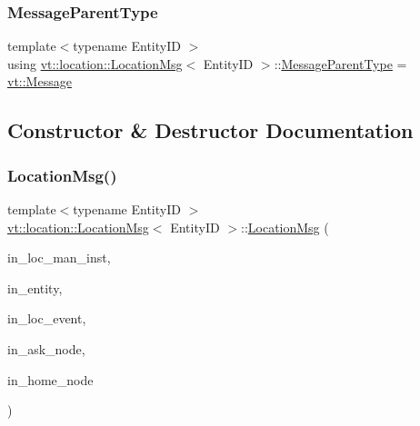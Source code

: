 \subsubsection{\texorpdfstring{Message\+Parent\+Type}{MessageParentType}}
{\footnotesize\ttfamily template$<$typename Entity\+ID $>$ \\
using \hyperlink{structvt_1_1location_1_1_location_msg}{vt\+::location\+::\+Location\+Msg}$<$ Entity\+ID $>$\+::\hyperlink{structvt_1_1messaging_1_1_active_msg_ac2e6d93267991027ce78c968b17064c7}{Message\+Parent\+Type} =  \hyperlink{namespacevt_a3a3ddfef40b4c90915fa43cdd5f129ea}{vt\+::\+Message}}



\subsection{Constructor \& Destructor Documentation}
\mbox{\label{structvt_1_1location_1_1_location_msg_af1b76aa81c81ed8ed2a9c9db4e5cff45}} 
\subsubsection{\texorpdfstring{Location\+Msg()}{LocationMsg()}\hspace{0.1cm}{\footnotesize\ttfamily [1/2]}}
{\footnotesize\ttfamily template$<$typename Entity\+ID $>$ \\
\hyperlink{structvt_1_1location_1_1_location_msg}{vt\+::location\+::\+Location\+Msg}$<$ Entity\+ID $>$\+::\hyperlink{structvt_1_1location_1_1_location_msg}{Location\+Msg} (\begin{DoxyParamCaption}\item[{\hyperlink{namespacevt_1_1location_a4db6456e8024af2d23fc5ae560fef866}{Loc\+Inst\+Type} const \&}]{in\+\_\+loc\+\_\+man\+\_\+inst,  }\item[{Entity\+ID const \&}]{in\+\_\+entity,  }\item[{\hyperlink{namespacevt_1_1location_aa5ccc1a42aa22b0b41fcfbbdee314dca}{Loc\+Event\+ID} const \&}]{in\+\_\+loc\+\_\+event,  }\item[{\hyperlink{namespacevt_a866da9d0efc19c0a1ce79e9e492f47e2}{Node\+Type} const \&}]{in\+\_\+ask\+\_\+node,  }\item[{\hyperlink{namespacevt_a866da9d0efc19c0a1ce79e9e492f47e2}{Node\+Type}}]{in\+\_\+home\+\_\+node }\end{DoxyParamCaption})\hspace{0.3cm}{\ttfamily [inline]}}

